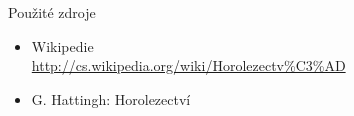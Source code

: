 \documentclass[pdf,fyma2, total]{prosper}
\begin{document}
\begin{slide}{Použité zdroje}
	\begin{itemize}
		\item{Wikipedie \\ \url{http://cs.wikipedia.org/wiki/Horolezectv%C3%AD}}
		\item{G. Hattingh: Horolezectví}
	\end{itemize}
\end{slide}
\end{document}
